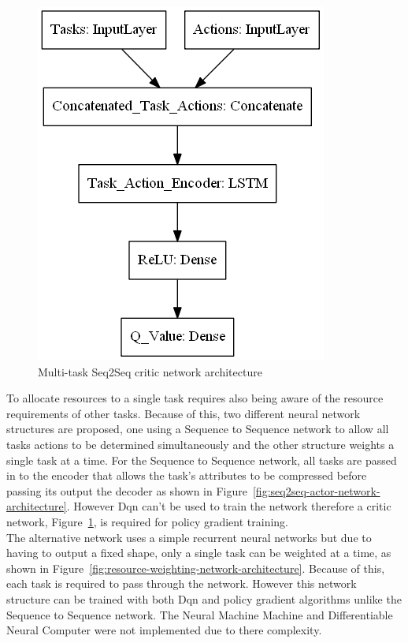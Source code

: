 \begin{figure}[H]
\begin{minipage}{0.55\linewidth}
        \includegraphics[width=\linewidth]{figures/3_solution_figs/single_task_critic_weighting_network_architecture.png}
        \caption{Multi-task Seq2Seq critic network architecture}
        \label{fig:seq2seq-critic-network-architecture}
    \end{minipage}
\end{figure}

To allocate resources to a single task requires also being aware of the resource requirements of other tasks. Because
of this, two different neural network structures are proposed, one using a Sequence to Sequence network to allow
all tasks actions to be determined simultaneously and the other structure weights a single task at a time. For the
Sequence to Sequence network, all tasks are passed in to the encoder that allows the task's attributes to be compressed
before passing its output the decoder as shown in Figure~\ref{fig:seq2seq-actor-network-architecture}. However Dqn can't
be used to train the network therefore a critic network, Figure~\ref{fig:seq2seq-critic-network-architecture}, is
required for policy gradient training. \\
The alternative network uses a simple recurrent neural networks but due to having to output a fixed shape, only a
single task can be weighted at a time, as shown in Figure~\ref{fig:resource-weighting-network-architecture}. Because of
this, each task is required to pass through the network. However this network structure can be trained with both
Dqn and policy gradient algorithms unlike the Sequence to Sequence network. The Neural Machine Machine and
Differentiable Neural Computer were not implemented due to there complexity.

